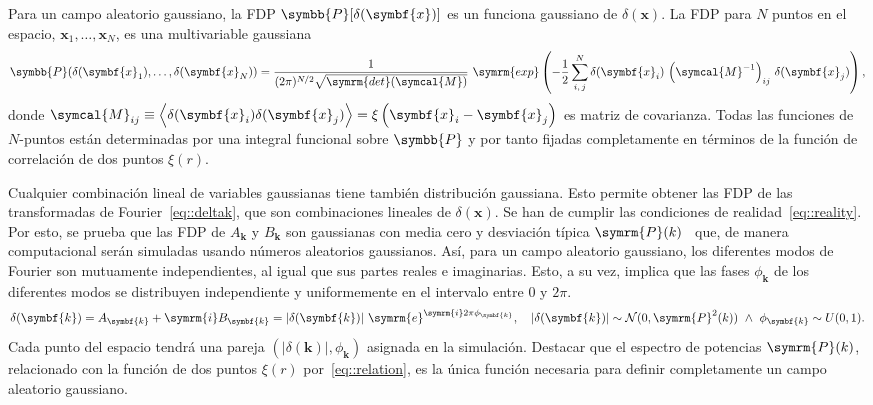 Para un campo aleatorio gaussiano, la FDP \(\symbb{P}[\delta(\symbf{x})]\) es un funciona gaussiano de \(\delta(\symbf{x})\). La FDP para \(N\) puntos en el espacio, \(\symbf{x}_1,\ldots,\symbf{x}_N\), es una multivariable gaussiana
\begin{equation}
    \symbb{P}(\delta(\symbf{x}_1),\ldots,\delta(\symbf{x}_N))=\frac{1}{(2\pi)^{N/2}\sqrt{\symrm{det}(\symcal{M})}}\ \symrm{exp}\left(-\frac{1}{2}\sum^N_{i,\,j}\delta(\symbf{x}_i)\,\left(\symcal{M}^{-1}\right)_{ij}\,\delta(\symbf{x}_j)\right),
\end{equation}
donde \(\symcal{M}_{ij}\equiv\left\langle\delta(\symbf{x}_i)\delta(\symbf{x}_j)\right\rangle=\xi\left(\symbf{x}_i-\symbf{x}_j\right)\) es matriz de covarianza. Todas las funciones de \(N\)-puntos están determinadas por una integral funcional sobre \(\symbb{P}\) y por tanto fijadas completamente en términos de la función de correlación de dos puntos \(\xi(r)\).

Cualquier combinación lineal de variables gaussianas tiene también distribución gaussiana. Esto permite obtener las FDP de las transformadas de Fourier~\eqref{eq::deltak}, que son combinaciones lineales de \(\delta(\symbf{x})\). Se han de cumplir las condiciones de realidad~\eqref{eq::reality}. Por esto, se prueba que las FDP de \(A_{\symbf{k}}\) y \(B_{\symbf{k}}\) son gaussianas con media cero y desviación típica \(\symrm{P}(k)\)~\cite{mo_van} que, de manera computacional serán simuladas usando números aleatorios gaussianos. Así, para un campo aleatorio gaussiano, los diferentes modos de Fourier son mutuamente independientes, al igual que sus partes reales e imaginarias. Esto, a su vez, implica que las fases \(\phi_{\symbf{k}}\) de los diferentes modos se distribuyen independiente y uniformemente en el intervalo entre 0 y \(2\pi\).
\begin{equation}
    \delta(\symbf{k})=A_{\symbf{k}}+\symrm{i}B_{\symbf{k}}=\left|\delta(\symbf{k})\right|\,\symrm{e}^{\symrm{i}2\pi\phi_{\symbf{k}}},\quad \left|\delta(\symbf{k})\right|\sim\mathcal{N}(0,\symrm{P}^2(k))\ \wedge\ \phi_{\symbf{k}}\sim U(0,1).
\end{equation}
Cada punto del espacio tendrá una pareja \(\left(\left|\delta(\symbf{k})\right|,\phi_{\symbf{k}}\right)\) asignada en la simulación. Destacar que el espectro de potencias \(\symrm{P}(k)\), relacionado con la función de dos puntos \(\xi(r)\) por~\eqref{eq::relation}, es la única función necesaria para definir completamente un campo aleatorio gaussiano.

